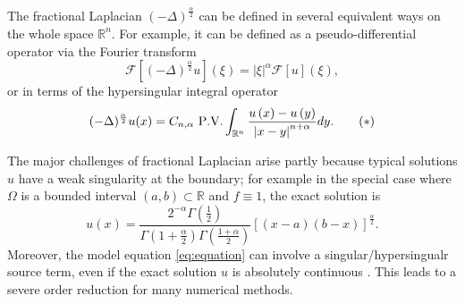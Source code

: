 \documentclass{amsart}
\theoremstyle{definition}
\theoremstyle{remark}
\numberwithin{equation}{section}
\begin{document}
The fractional Laplacian $\left(-\Delta\right)^{\frac{\alpha}{2}}$  can be defined in several equivalent ways \cite{MR3613319, MR4043885} on the whole space $ \mathbb{R}^n$. 
 For example, it can be defined  as a pseudo-differential operator  via the Fourier transform 
\[\mathcal{F}[\left(-\Delta\right)^{\frac{\alpha}{2}}u](\xi)=|\xi|^\alpha\mathcal{F}[u](\xi),\]
or in terms of the hypersingular integral operator 
\begin{gather*} \label{def:IFLO}
(-\Delta)^{\frac{\alpha}{2}} u(x)=C_{n,\alpha} \,\,{\rm P.V.} \int_{\mathbb{R}^n}
		{\frac{u\left( x \right) -u\left( y \right)}{\left| x-y \right|^{n+\alpha}}dy}. \tag{$*$}
\end{gather*}

The major challenges   of fractional Laplacian arise partly because typical solutions $u$
 have a weak singularity at the boundary; for example in the special case where $\Omega$ is a bounded interval $(a,b)\subset\mathbb{R}$ and $f\equiv 1$, the exact solution is \cite{Getoor1961,HuangO:14,RosOtonSerra:14}
\begin{equation*}\label{uf1}
		u(x)=\frac{2^{-\alpha} \varGamma \left( \frac{1}{2} \right)}{\varGamma \left( 1+\frac{\alpha}{2} \right) \varGamma \left( \frac{1+\alpha}{2} \right)} \left[ (x-a)\left( b-x \right) \right] ^{\frac{\alpha}{2}}.
\end{equation*}
Moreover, the model equation \eqref{eq:equation}  can involve a singular/hypersingualr  source term, even if the exact solution $u$ is absolutely continuous \cite{MR4662768,MR4787529,MR4450105}.
This leads to a   severe order reduction for many  numerical methods.

\end{document}
